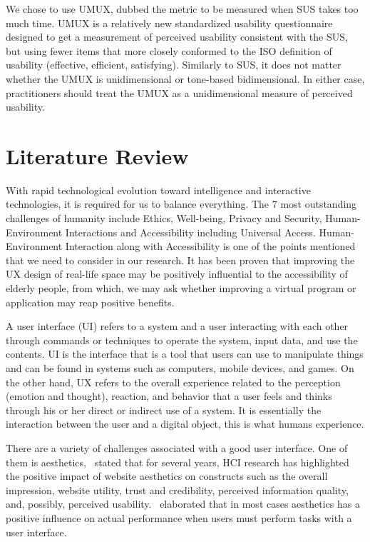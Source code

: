 \documentclass[conference]{IEEEtran}
\begin{document}
We chose to use UMUX, dubbed the metric to be measured when SUS takes too much time\cite{Lewis2013UMUXLITEWT}. UMUX is a relatively new standardized usability questionnaire designed to get a measurement of perceived usability consistent with the SUS\cite{Berkman2016ReassessingTU, Lewis2019MeasuringPU}, but using fewer items that more closely conformed to the ISO definition of usability (effective, efficient, satisfying). Similarly to SUS, it does not matter whether the UMUX is unidimensional or tone-based bidimensional\cite{Lewis2018MeasuringPU}. In either case, practitioners should treat the UMUX as a unidimensional measure of perceived usability\cite{Lewis2018MeasuringPU}.

\section{Literature Review}

With rapid technological evolution toward intelligence and interactive technologies, it is required for us to balance everything. The 7 most outstanding challenges of humanity include Ethics, Well-being, Privacy and Security, Human-Environment Interactions and Accessibility including Universal Access\cite{Stephanidis2019SevenHG}. Human-Environment Interaction along with Accessibility is one of the points mentioned that we need to consider in our research. It has been proven that improving the UX design of real-life space may be positively influential to the accessibility of elderly people\cite{Yoo2021TheEO}, from which, we may ask whether improving a virtual program or application may reap positive benefits.

A user interface (UI) refers to a system and a user interacting with each other through commands or techniques to operate the system, input data, and use the contents\cite{Jooh}. UI is the interface that is a tool that users can use to manipulate things\cite{Roth2017UserIA} and can be found in systems such as computers, mobile devices, and games\cite{Jooh}. On the other hand, UX refers to the overall experience related to the perception (emotion and thought), reaction, and behavior that a user feels and thinks through his or her direct or indirect use of a system\cite{Jooh}. It is essentially the interaction between the user and a digital object, this is what humans experience\cite{Roth2017UserIA}.

There are a variety of challenges associated with a good user interface. One of them is aesthetics,~\cite{GlenaH} stated that for several years, HCI research has highlighted the positive impact of website aesthetics on constructs such as the overall impression, website utility, trust and credibility, perceived information quality, and, possibly, perceived usability.~\cite{SchmidtWolff+2018+41+55} elaborated that in most cases aesthetics has a positive influence on actual performance when users must perform tasks with a user interface.
\end{document}

